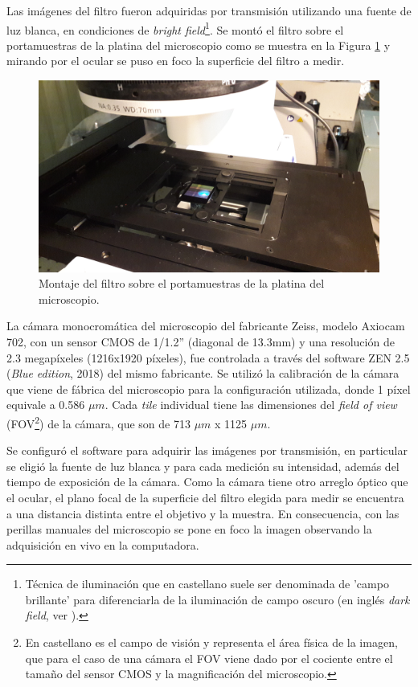 Las imágenes del filtro fueron adquiridas por transmisión utilizando una fuente de luz blanca, en condiciones de \textit{bright field}\footnote{Técnica de iluminación que en castellano suele ser denominada de 'campo brillante' para diferenciarla de la iluminación de campo oscuro (en inglés \textit{dark field}, ver \href{https://es.wikipedia.org/wiki/Microscopio_de_campo_oscuro}{\faWikipediaW}).}. Se montó el filtro sobre el portamuestras de la platina del microscopio como se muestra en la Figura \ref{fig:filtroenZEISS} y mirando por el ocular se puso en foco la superficie del filtro a medir.  
\begin{figure}[H]
	\centering
	\includegraphics[scale=0.1]{Figs/defectosZEISS/a.jpg}
	\caption{Montaje del filtro sobre el portamuestras de la platina del microscopio.}
	\label{fig:filtroenZEISS}
\end{figure}
La cámara monocromática del microscopio del fabricante Zeiss, modelo Axiocam 702, con un sensor CMOS de 1/1.2'' (diagonal de 13.3mm) y una resolución de 2.3 megapíxeles (1216x1920 píxeles), fue controlada a través del software ZEN 2.5 (\textit{Blue edition}, 2018) del mismo fabricante. Se utilizó la calibración de la cámara que viene de fábrica del microscopio para la configuración utilizada, donde 1 píxel equivale a 0.586 $\mu m$.  Cada \textit{tile} individual tiene las dimensiones del \textit{field of view} (FOV\footnote{En castellano es el campo de visión y representa el área física de la imagen, que para el caso de una cámara el FOV viene dado por el cociente entre el tamaño del sensor CMOS y la magnificación del microscopio.}) de la cámara, que son de 713 $\mu m$ x 1125 $\mu m$. 

Se configuró el software para adquirir las imágenes por transmisión, en particular se eligió la fuente de luz blanca y para cada medición su intensidad, además del tiempo de exposición de la cámara. Como la cámara tiene otro arreglo óptico que el ocular, el plano focal de la superficie del filtro elegida para medir se encuentra a una distancia distinta entre el objetivo y la muestra. En consecuencia, con las perillas manuales del microscopio se pone en foco la imagen observando la adquisición en vivo en la computadora. 



